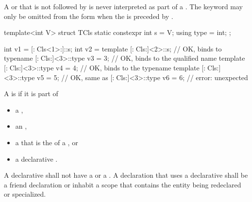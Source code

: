 \pnum
A  or
that is not followed by \tcode{::}
is never interpreted as part of a .
The keyword  may only be omitted
from the form
when the 
is preceded by .
\begin{example}
\begin{codeblock}
template<int V>
struct TCls {
  static constexpr int s = V;
  using type = int;
};

int v1 = [:^^TCls<1>:]::s;
int v2 = template [:^^TCls:]<2>::s;             // OK,  binds to 
typename [:^^TCls:]<3>::type v3 = 3;            // OK,  binds to the qualified name
template [:^^TCls:]<3>::type v4 = 4;            // OK,  binds to the 
typename template [:^^TCls:]<3>::type v5 = 5;   // OK, same as 
[:^^TCls:]<3>::type v6 = 6;                     // error: unexpected \tcode{<}
\end{codeblock}
\end{example}

\pnum
A  is  if it is part of
\begin{itemize}
\item
a ,
\item
an ,
\item
a 
that is the  of a , or
\item
a declarative .
\end{itemize}
A declarative 
shall not have a  or
a .
A declaration that uses a declarative 
shall be a friend declaration or
inhabit a scope that contains the entity being redeclared or specialized.

